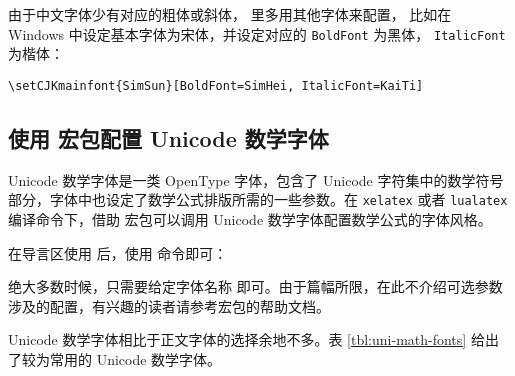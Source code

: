 由于中文字体少有对应的粗体或斜体， 里多用其他字体来配置，
比如在 Windows 中设定基本字体为宋体，并设定对应的 \texttt{BoldFont} 为黑体， \texttt{ItalicFont} 为楷体：
\begin{verbatim}
\setCJKmainfont{SimSun}[BoldFont=SimHei, ItalicFont=KaiTi]
\end{verbatim}

\subsection{使用  宏包配置 Unicode 数学字体}\label{subsec:unicode-math}

Unicode 数学字体是一类 OpenType 字体，包含了 Unicode 字符集中的数学符号部分，字体中也设定了数学公式排版所需的一些参数。在 \texttt{xelatex} 或者 \texttt{lualatex} 编译命令下，借助  宏包可以调用 Unicode 数学字体配置数学公式的字体风格。

在导言区使用  后，使用  命令即可：
\begin{command}
\end{command}

绝大多数时候，只需要给定字体名称  即可。由于篇幅所限，在此不介绍可选参数  涉及的配置，有兴趣的读者请参考宏包的帮助文档。

Unicode 数学字体相比于正文字体的选择余地不多。表 \ref{tbl:uni-math-fonts} 给出了较为常用的 Unicode 数学字体。

